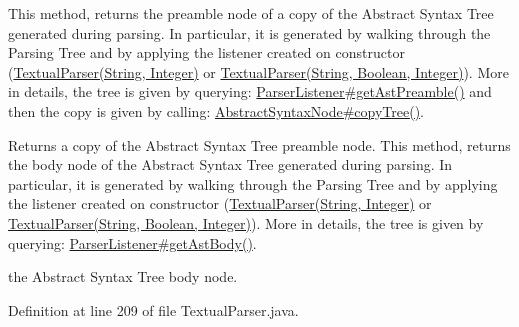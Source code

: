 This method, returns the preamble node of a copy of the Abstract Syntax Tree generated during parsing. In particular, it is generated by walking through the Parsing Tree and by applying the listener created on constructor (\hyperlink{classit_1_1emarolab_1_1cagg_1_1core_1_1language_1_1parser_1_1TextualParser_a4635df475bf70bb164ed66352ec9cc6d}{Textual\-Parser(\-String, Integer)} or \hyperlink{classit_1_1emarolab_1_1cagg_1_1core_1_1language_1_1parser_1_1TextualParser_a21c889dd346843225cc6e9034ae0005c}{Textual\-Parser(\-String, Boolean, Integer)}). More in details, the tree is given by querying\-: \hyperlink{classit_1_1emarolab_1_1cagg_1_1core_1_1language_1_1parser_1_1ANTLRInterface_1_1TreeParserListener_ac0ea0fcdfb6a42c450dbbfdb49f6acfb}{Parser\-Listener\#get\-Ast\-Preamble()} and then the copy is given by calling\-: \hyperlink{}{Abstract\-Syntax\-Node\#copy\-Tree()}. \begin{DoxyReturn}{Returns}
a copy of the Abstract Syntax Tree preamble node. This method, returns the body node of the Abstract Syntax Tree generated during parsing. In particular, it is generated by walking through the Parsing Tree and by applying the listener created on constructor (\hyperlink{classit_1_1emarolab_1_1cagg_1_1core_1_1language_1_1parser_1_1TextualParser_a4635df475bf70bb164ed66352ec9cc6d}{Textual\-Parser(\-String, Integer)} or \hyperlink{classit_1_1emarolab_1_1cagg_1_1core_1_1language_1_1parser_1_1TextualParser_a21c889dd346843225cc6e9034ae0005c}{Textual\-Parser(\-String, Boolean, Integer)}). More in details, the tree is given by querying\-: \hyperlink{classit_1_1emarolab_1_1cagg_1_1core_1_1language_1_1parser_1_1ANTLRInterface_1_1TreeParserListener_aaa9fecbf4191a4ff7eb021a27397ee70}{Parser\-Listener\#get\-Ast\-Body()}. 

the Abstract Syntax Tree body node. 
\end{DoxyReturn}


Definition at line 209 of file Textual\-Parser.\-java.

